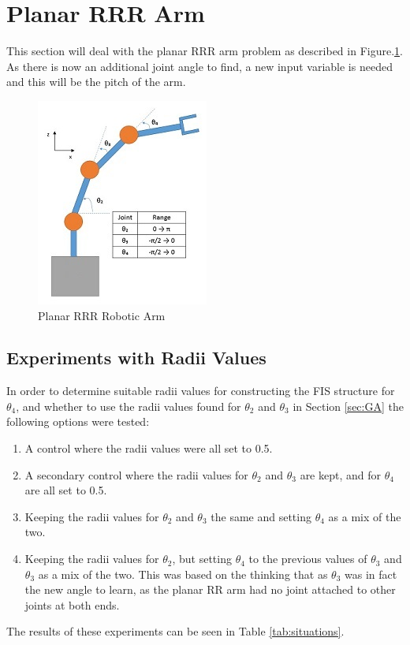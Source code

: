 \documentclass[11.5pt, twoside, a4paper]{article}
\begin{document}
\section{Planar RRR Arm}

This section will deal with the planar RRR arm problem as described in Figure.\ref{fig:3Link}. As there is now an additional joint angle to find, a new input variable is needed and this will be the pitch of the arm.
\begin{figure} 
\begin{center}
\includegraphics{3Link.jpg}
\caption{Planar RRR Robotic Arm \label{fig:3Link}}
\end{center}
\end{figure}

\subsection{Experiments with Radii Values}
In order to determine suitable radii values for constructing the FIS structure for $\theta_4$, and whether to use the radii values found for $\theta_2$ and $\theta_3$ in Section \ref{sec:GA} the following options were tested:
\begin{enumerate}
\item A control where the radii values were all set to 0.5.
\item A secondary control where the radii values for $\theta_2$ and $\theta_3$ are kept, and for $\theta_4$ are all set to 0.5.
\item Keeping the radii values for $\theta_2$ and $\theta_3$ the same and setting $\theta_4$ as a mix of the two.
\item Keeping the radii values for $\theta_2$, but setting $\theta_4$ to the previous values of $\theta_3$ and $\theta_3$ as a mix of the two. This was based on the thinking that as $\theta_3$ was in fact the new angle to learn, as the planar RR arm had no joint attached to other joints at both ends.
\end{enumerate}
The results of these experiments can be seen in Table \ref{tab:situations}.
\end{document}
